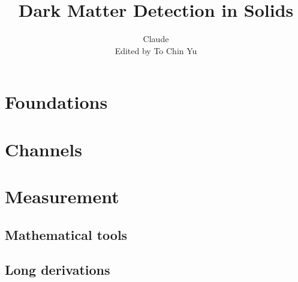 \documentclass[11pt,twoside,openright]{book}
\title{Dark Matter Detection in Solids}
\author{Claude\\[0.5ex]{\normalsize Edited by To Chin Yu}}
\date{}
\begin{document}
\frontmatter
\maketitle
\tableofcontents

\mainmatter
\part{Foundations}








\part{Channels}









\part{Measurement}





\appendix
{}


\chapter{Mathematical tools}\label{app:C}









\setcounter{section}{17}

\printbibliography[heading=subbibliography]
\chapter{Long derivations}\label{app:D}















































\printbibliography[heading=subbibliography]


\backmatter
\end{document}

